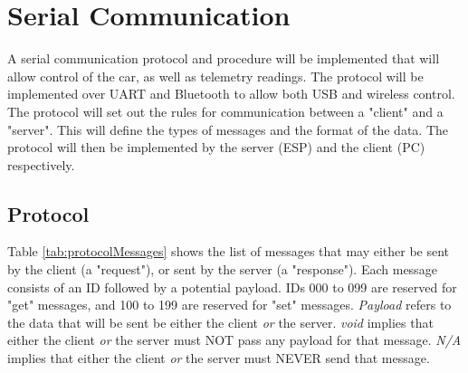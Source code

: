 \graphicspath{{content/2_design/figures/}}
\section{Serial Communication}

A serial communication protocol and procedure will be implemented that will allow control of the car, as well as telemetry readings.
The protocol will be implemented over UART and Bluetooth to allow both USB and wireless control. The protocol will set out
the rules for communication between a "client" and a "server". This will define the types of messages and the format of the data.
The protocol will then be implemented by the server (ESP) and the client (PC) respectively.

\subsection{Protocol}

Table \ref{tab:protocolMessages} shows the list of messages that may either be sent by the client (a "request"),
or sent by the server (a "response"). Each message consists of an ID followed by a potential payload.
IDs 000 to 099 are reserved for "get" messages, and 100 to 199 are reserved for "set" messages.
\textit{Payload} refers to the data that will be sent be either the client \textit{or} the server.
\textit{void} implies that either the client \textit{or} the server must NOT pass any payload for that message.
\textit{N/A} implies that either the client \textit{or} the server must NEVER send that message.

